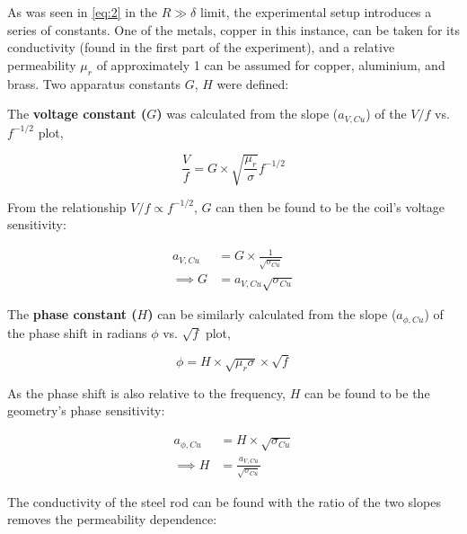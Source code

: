 \documentclass[11pt, a4paper, twocolumn]{article}
\begin{document}
As was seen in \autoref{eq:2} in the $R \gg \delta$ limit, the experimental setup introduces a series of constants. One of the metals, copper in this instance, can be taken for its conductivity (found in the first part of the experiment), and a relative permeability $\mu_r$ of approximately 1 can be assumed for copper, aluminium, and brass. Two apparatus constants $G$, $H$ were defined:

The \textbf{voltage constant ($G$)} was calculated from the slope ($a_{V,Cu}$) of the $V/f$ vs. $f^{-1/2}$ plot,

\vspace{-1.5ex}
\begin{equation*}
  \frac{V}{f} = G \times \sqrt{\frac{\mu_r}{\sigma}} f^{-1/2}
\end{equation*}

From the relationship $V/f \propto f^{-1/2}$, $G$ can then be found to be the coil's voltage sensitivity:

\vspace{-1.5ex}
\begin{equation} \label{eq:3}
  \begin{aligned}
  a_{V,Cu} &= G \times \frac{1}{\sqrt{\sigma_{Cu}}} \\
  \implies G &= a_{V,Cu} \sqrt{\sigma_{Cu}}
  \end{aligned}
\end{equation}

The \textbf{phase constant ($H$)} can be similarly calculated from the slope ($a_{\phi,Cu}$) of the phase shift in radians $\phi$ vs. $\sqrt{f}$ plot,

\begin{equation*}
  \phi = H \times \sqrt{\mu_r \sigma} \times \sqrt{f}
\end{equation*}

As the phase shift is also relative to the frequency, $H$ can be found to be the geometry's phase sensitivity:

\vspace{-1.5ex}
\begin{equation} \label{eq:4}
  \begin{aligned}
  a_{\phi,Cu} &= H \times \sqrt{\sigma_{Cu}} \\
  \implies H &= \frac{a_{V,Cu}}{\sqrt{\sigma_{Cu}}}
  \end{aligned}
\end{equation}

The conductivity of the steel rod can be found with the ratio of the two slopes removes the permeability dependence:
\end{document}
